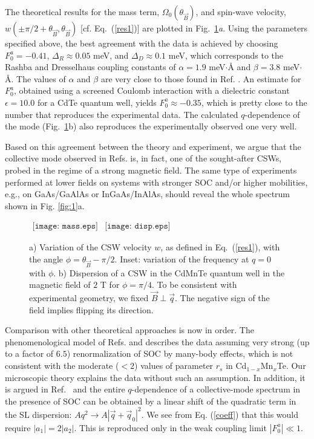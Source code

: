\documentclass[prb,aps,twocolumn]{revtex4}
\newcommand{\bq}{{\vec q}}
\newcommand{\bB}{{\vec B}}
\begin{document}
The theoretical results for the mass term, $\Omega_0(\theta_{\vec
B})$, and spin-wave velocity, $w(\pm\pi/2+\theta_\bB,\theta_\bB)$
[cf. Eq.~(\ref{res1})] are plotted in Fig.~\ref{fig:2}{\em a}.
Using the parameters specified above, the best agreement with the
data  is achieved by choosing $F_0^a=-0.41$, $\Delta_R\approx
0.05$ meV, and $\Delta_D\approx 0.1$ meV, which corresponds to the
Rashba and Dresselhaus coupling constants of $\alpha=1.9$
meV$\cdot$\AA\; and $\beta=3.8$ meV$\cdot$\AA. The values of
$\alpha$ and $\beta$ are very close to those found in Ref.
. An estimate for $F^a_0$, obtained using a
screened Coulomb interaction with a dielectric constant
${\epsilon}=10.0$ for a CdTe quantum well,\cite{eps} yields
$F_0^a\approx-0.35$, which is pretty close to the number that
reproduces the experimental data. The calculated $q$-dependence of
the mode (Fig.~\ref{fig:2}b) also reproduces the experimentally
observed one very well.

Based on this agreement between the theory and experiment, we
argue that the collective mode observed in Refs.
 is, in fact, one of the sought-after
CSWs,\cite{Shekhter,Ali1,Zhang,SM1} probed in the regime of a
strong magnetic field. The same type of experiments performed at
lower fields on systems with stronger SOC and/or higher
mobilities, e.g., on {GaAs/GaAlAs} or InGaAs/InAlAs, should reveal
the whole spectrum shown in Fig. \ref{fig:1}a.

\begin{figure}[htp]
$\begin{array}{cc}
\texttt{[image: mass.eps]}&
\texttt{[image: disp.eps]}
\end{array}$
\caption{ \label{fig:2} a) Variation of the CSW velocity $w$, as
defined in Eq.~(\ref{res1}), with the angle $
\phi=\theta_{\bB}-\pi/2$. Inset: variation of the frequency at
$q=0$ with $\phi$.  b) Dispersion of a CSW in the CdMnTe quantum
well in the magnetic field of  $2$ T  for $\phi=\pi/4$. To be
consistent with experimental geometry, we fixed $\vec B\perp\bq$.
The negative sign of the field implies flipping its direction.}
\end{figure}


Comparison with other theoretical approaches is now in order. The
phenomenological model of Refs.  and
 describes the data assuming very strong (up to a
factor of $6.5$) renormalization of SOC by many-body effects,
which is not consistent with the moderate ($<2$) values of
parameter $r_s$ in Cd$_{1-x}$Mn$_{x}$Te. Our microscopic theory
explains the data without such an assumption. In addition, it is
argued in Ref.~ and  the entire
$q$-dependence of a collective-mode spectrum in the presence of
SOC can be obtained by a linear shift of the quadratic term in the
SL dispersion: $Aq^2\to A|\vec q+\vec q_0|^2$. We see from
Eq. (\ref{coeff}) that this would require $|a_1|=2|a_2|$. This is
reproduced only in the weak coupling limit $|F_0^a|\ll1$.
\end{document}
